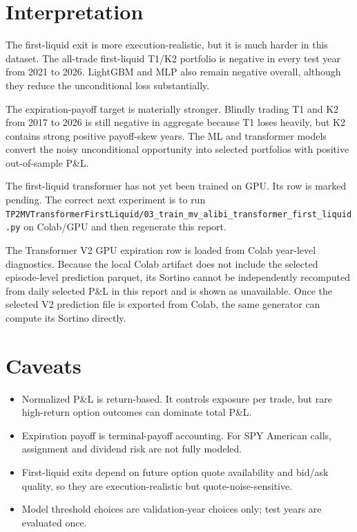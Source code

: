 \documentclass[11pt]{article}
\begin{document}
\section{Interpretation}
The first-liquid exit is more execution-realistic, but it is much harder in this dataset. The all-trade first-liquid T1/K2 portfolio is negative in every test year from 2021 to 2026. LightGBM and MLP also remain negative overall, although they reduce the unconditional loss substantially.

The expiration-payoff target is materially stronger. Blindly trading T1 and K2 from 2017 to 2026 is still negative in aggregate because T1 loses heavily, but K2 contains strong positive payoff-skew years. The ML and transformer models convert the noisy unconditional opportunity into selected portfolios with positive out-of-sample P\&L.

The first-liquid transformer has not yet been trained on GPU. Its row is marked pending. The correct next experiment is to run \texttt{TP2MVTransformerFirstLiquid/03\_train\_mv\_alibi\_transformer\_first\_liquid.py} on Colab/GPU and then regenerate this report.

The Transformer V2 GPU expiration row is loaded from Colab year-level diagnostics. Because the local Colab artifact does not include the selected episode-level prediction parquet, its Sortino cannot be independently recomputed from daily selected P\&L in this report and is shown as unavailable. Once the selected V2 prediction file is exported from Colab, the same generator can compute its Sortino directly.

\section{Caveats}
\begin{itemize}
  \item Normalized P\&L is return-based. It controls exposure per trade, but rare high-return option outcomes can dominate total P\&L.
  \item Expiration payoff is terminal-payoff accounting. For SPY American calls, assignment and dividend risk are not fully modeled.
  \item First-liquid exits depend on future option quote availability and bid/ask quality, so they are execution-realistic but quote-noise-sensitive.
  \item Model threshold choices are validation-year choices only; test years are evaluated once.
\end{itemize}
\end{document}
